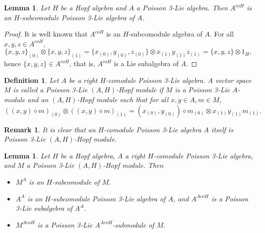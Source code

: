 \documentclass[11pt]{article}
\newtheorem{lemma}[theorem]{Lemma}
\newtheorem{definition}[theorem]{Definition}
\newtheorem{remark}[theorem]{Remark}
\def\di{\diamond}
\def\ot{\otimes}
\begin{document}
\begin{lemma}\label{lem:2a}
Let $H$ be a Hopf algebra and $A$ a Poisson 3-Lie algebra. Then $A^{coH}$ is an $H$-subcomodule Poisson 3-Lie algebra of $A$.
\end{lemma}

\begin{proof}
It is well known that $A^{coH}$ is an $H$-subcomodule algebra of $A$. For all $x,y,z\in A^{coH}$,
$$\{x,y,z\}_{(0)}\ot\{x,y,z\}_{(1)}=\{x_{(0)},y_{(0)},z_{(0)}\}\ot x_{(1)}y_{(1)}z_{(1)}=\{x,y,z\}\ot 1_H,$$
hence $\{x,y,z\}\in A^{coH}$, that is, $A^{coH}$ is a Lie subalgebra of $A$.
\end{proof}

\begin{definition}
Let $A$ be a right $H$-comodule Poisson 3-Lie algebra. A vector space $M$ is called a Poisson 3-Lie $(A,H)$-Hopf module if $M$ is a Poisson 3-Lie $A$-module and an $(A,H)$-Hopf module such that for all $x,y\in A,m\in M$,
\begin{equation}
((x,y)\di m)_{(0)}\ot ((x,y)\di m)_{(1)}=(x_{(0)},y_{(0)})\di m_{(0)}\ot x_{(1)}y_{(1)}m_{(1)}.\label{2b}
\end{equation}
\end{definition}

\begin{remark}
It is clear that an $H$-comodule Poisson 3-Lie algebra $A$ itself is Poisson 3-Lie $(A,H)$-Hopf module.
\end{remark}

\begin{lemma}\label{lem:2b}
Let $H$ be a Hopf algebra, $A$ a right $H$-comodule Poisson 3-Lie algebra, and $M$ a Poisson 3-Lie $(A,H)$-Hopf module. Then
\begin{itemize}
  \item [(1)] $M^A$ is an $H$-subcomodule of $M$.
  \item [(2)] $A^A$ is an $H$-subcomodule Poisson 3-Lie algebra of $A$, and $A^{AcoH}$ is a Poisson 3-Lie subalgebra of $A^A$.
  \item [(3)] $M^{AcoH}$ is a Poisson 3-Lie $A^{AcoH}$-submodule of $M$.
\end{itemize}
\end{lemma}
\end{document}
